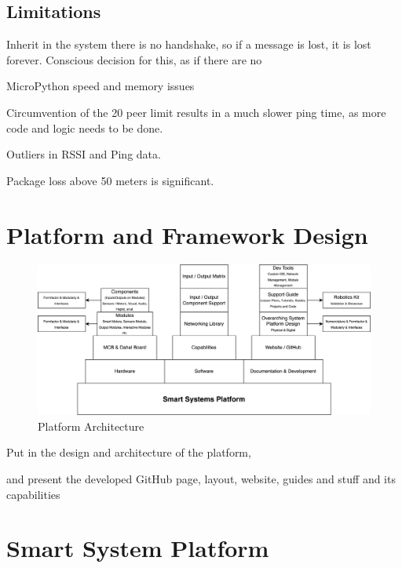 \subsection{\label{sec:res_limitations}Limitations}


Inherit in the system there is no handshake, so if a message is lost, it is lost forever. Conscious decision for this, as if there are no 

MicroPython speed and memory issues

Circumvention of the 20 peer limit results in a much slower ping time, as more code and logic needs to be done.


Outliers in RSSI and Ping data.

Package loss above 50 meters is significant.


\section{\label{sec:res_design}Platform and Framework Design} %

\begin{figure}[H]
    \centering
    \includegraphics[width=\linewidth]{overleaf/images/Smart Systems Platform.drawio.png}
    \vspace{\ftspace}
    \caption{Platform Architecture}
    \label{fig:ssp_architecture}
\end{figure}

Put in the design and architecture of the platform,


and present the developed GitHub page, layout, website, guides and stuff and its capabilities

\section{\label{sec:res_capabilities}Smart System Platform} %

